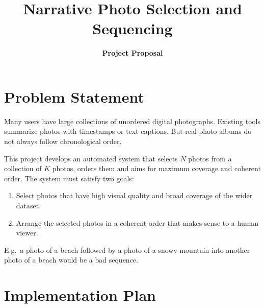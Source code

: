 \documentclass[11pt,a4paper]{article}
\title{Narrative Photo Selection and Sequencing}
\author{\textbf{Project Proposal}}
\date{}
\begin{document}
\maketitle

\section{Problem Statement}

Many users have large collections of unordered digital photographs.
Existing tools summarize photos with timestamps or text captions.
But real photo albums do not always follow chronological order.

This project develops an automated system that selects $N$ photos from a
collection of $K$ photos, orders them and aims for maximum coverage and coherent order.
The system must satisfy two goals:

\begin{enumerate}
  \item Select photos that have high visual quality and broad coverage of the wider dataset.
  \item Arrange the selected photos in a coherent order that makes sense to a human viewer.
\end{enumerate}

E.g.\ a photo of a beach followed by a photo of a snowy mountain into another photo of a beach would be a bad sequence.

\section{Implementation Plan}
\end{document}
